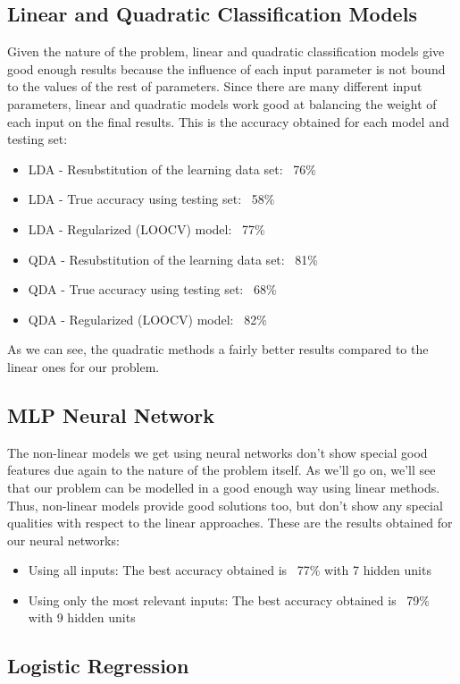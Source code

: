 \documentclass[english]{scrartcl}
\begin{document}
    \subsection{Linear and Quadratic Classification Models}
    Given the nature of the problem, linear and quadratic classification models give good enough results because the influence
    of each input parameter is not bound to the values of the rest of parameters. Since there are many different input parameters,
    linear and quadratic models work good at balancing the weight of each input on the final results. This is the accuracy
    obtained for each model and testing set:
    \begin{itemize}
    \item LDA - Resubstitution of the learning data set: ~76\%
    \item LDA - True accuracy using testing set: ~58\%
    \item LDA - Regularized (LOOCV) model: ~77\%
    \item QDA - Resubstitution of the learning data set: ~81\%
    \item QDA - True accuracy using testing set: ~68\%
    \item QDA - Regularized (LOOCV) model: ~82\%
    \end{itemize}
    As we can see, the quadratic methods a fairly better results compared to the linear ones for our problem.
    
    \subsection{MLP Neural Network}\label{sec:results:nnet}
    The non-linear models we get using neural networks don't show special good features due again to the nature of the problem itself.
    As we'll go on, we'll see that our problem can be modelled in a good enough way using linear methods. Thus, non-linear models provide
    good solutions too, but don't show any special qualities with respect to the linear approaches. These are the results obtained for
    our neural networks:
    \begin{itemize}
    \item Using all inputs: The best accuracy obtained is ~77\% with 7 hidden units
    \item Using only the most relevant inputs: The best accuracy obtained is ~79\% with 9 hidden units
    \end{itemize}
    
    \subsection{Logistic Regression}
    
\end{document}
